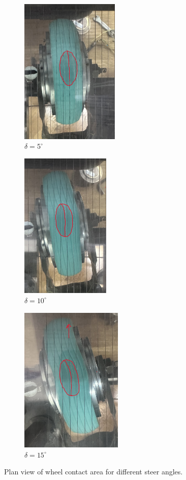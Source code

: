 \documentclass{article}
\begin{document}
\begin{figure}[H]
    \centering
    \begin{subfigure}{0.3\textwidth}
        \centering
        \includegraphics[height=7cm]{photos/5an.jpg}
        \caption{$\delta = 5^\circ$}
        \label{fig:contact_5}
    \end{subfigure}
    \begin{subfigure}{0.3\textwidth}
        \centering
        \includegraphics[height=7cm]{photos/10an.jpg}
        \caption{$\delta = 10^\circ$}
        \label{fig:contact_10}
    \end{subfigure}
    \begin{subfigure}{0.3\textwidth}
        \centering
        \includegraphics[height=7cm]{photos/15an.jpg}
        \caption{$\delta = 15^\circ$}
        \label{fig:contact_15}
    \end{subfigure}
    \caption{Plan view of wheel contact area for different steer angles.}
    \label{fig:contact_photos}
\end{figure}
\end{document}
